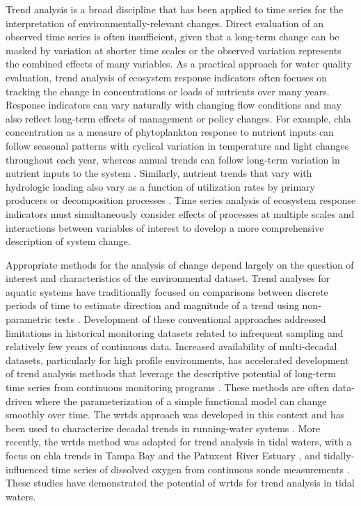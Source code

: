 \documentclass[journal = esthag, manuscript = article]{achemso}\usepackage[]{graphicx}\usepackage[]{color}
\begin{document}
Trend analysis is a broad discipline that has been applied to time series for the interpretation of environmentally-relevant changes.  Direct evaluation of an observed time series is often insufficient, given that a long-term change can be masked by variation at shorter time scales or the observed variation represents the combined effects of many variables\cite{Oneill89,Levin92}.  As a practical approach for water quality evaluation, trend analysis of ecosystem response indicators often focuses on tracking the change in concentrations or loads of nutrients over many years. Response indicators can vary naturally with changing flow conditions and may also reflect long-term effects of management or policy changes. For example, \ac{chla} concentration as a measure of phytoplankton response to nutrient inputs can follow seasonal patterns with cyclical variation in temperature and light changes throughout each year, whereas annual trends can follow long-term variation in nutrient inputs to the system \cite{Cloern96,Cloern10}. Similarly, nutrient trends that vary with hydrologic loading also vary as a function of utilization rates by primary producers or decomposition processes \cite{Sakamoto89,Schultz08,Harding16}. Time series analysis of ecosystem response indicators must simultaneously consider effects of processes at multiple scales and interactions between variables of interest to develop a more comprehensive description of system change. 

Appropriate methods for the analysis of change depend largely on the question of interest and characteristics of the environmental dataset.  Trend analyses for aquatic systems have traditionally focused on comparisons between discrete periods of time to estimate direction and magnitude of a trend using non-parametric tests \cite{Hirsch91,Esterby96}. Development of these conventional approaches addressed limitations in historical monitoring datasets related to infrequent sampling and relatively few years of continuous data. Increased availability of multi-decadal datasets, particularly for high profile environments, has accelerated development of trend analysis methods that leverage the descriptive potential of long-term time series from continuous monitoring programs \cite{Bowes09,Halliday12}. These methods are often data-driven where the parameterization of a simple functional model can change smoothly over time.  The \ac{wrtds} approach was developed in this context and has been used to characterize decadal trends in running-water systems \cite{Hirsch10,Sprague11,Medalie12,Hirsch14,Pellerin14,Zhang16}. More recently, the \ac{wrtds} method was adapted for trend analysis in tidal waters, with a focus on \ac{chla} trends in Tampa Bay \cite{Beck15} and the Patuxent River Estuary \cite{Beck17}, and tidally-influenced time series of dissolved oxygen from continuous sonde measurements \cite{Beck15b}. These studies have demonstrated the potential of \ac{wrtds} for trend analysis in tidal waters.
\end{document}
